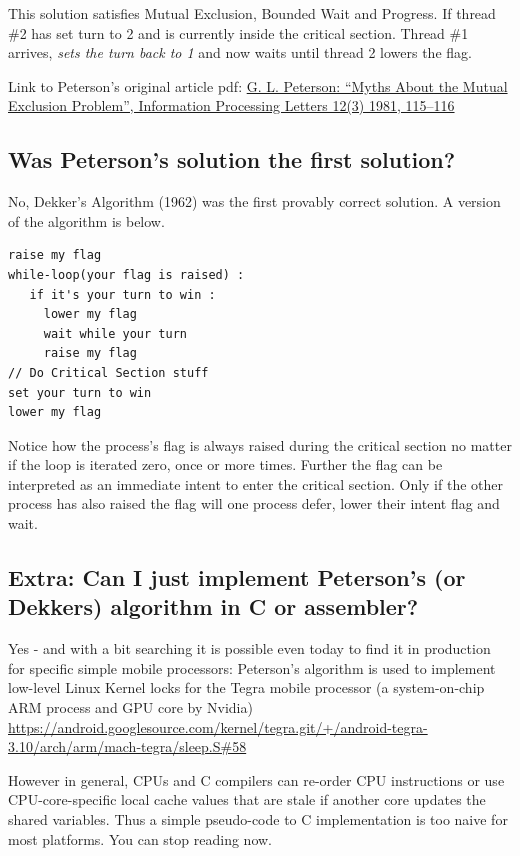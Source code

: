 This solution satisfies Mutual Exclusion, Bounded Wait and Progress.
If thread \#2 has set turn to 2 and is currently inside the critical section.
Thread \#1 arrives, \emph{sets the turn back to 1} and now waits until thread 2 lowers the flag.

Link to Peterson's original article pdf: \href{http://dl.acm.org/citation.cfm?id=945527}{G. L. Peterson: ``Myths About the Mutual Exclusion Problem'', Information Processing Letters 12(3) 1981, 115--116}

\subsection{Was Peterson's solution the first solution?}\label{was-petersons-solution-the-first-solution}

No, Dekker's Algorithm (1962) was the first provably correct solution. A version of the algorithm is below.

\begin{lstlisting}
raise my flag
while-loop(your flag is raised) :
   if it's your turn to win :
     lower my flag
     wait while your turn
     raise my flag
// Do Critical Section stuff
set your turn to win
lower my flag
\end{lstlisting}

Notice how the process's flag is always raised during the critical section no matter if the loop is iterated zero, once or more times. Further the flag can be interpreted as an immediate intent to enter the critical section. Only if the other process has also raised the flag will one process defer, lower their intent flag and wait.

\subsection{Extra: Can I just implement Peterson's (or Dekkers) algorithm in C or assembler?}

Yes - and with a bit searching it is possible even today to find it in production for specific simple mobile processors: Peterson's algorithm is used to implement low-level Linux Kernel locks for the Tegra mobile processor (a system-on-chip ARM process and GPU core by Nvidia) \href{Link to Lock Source}{https://android.googlesource.com/kernel/tegra.git/+/android-tegra-3.10/arch/arm/mach-tegra/sleep.S\#58}

However in general, CPUs and C compilers can re-order CPU instructions or use CPU-core-specific local cache values that are stale if another core updates the shared variables. Thus a simple pseudo-code to C implementation is too naive for most platforms. You can stop reading now.

